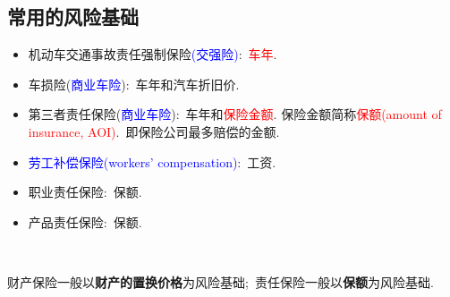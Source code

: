 \documentclass[professionalfont]{beamer}
\newcommand{\red}[1]{\textcolor{red}{#1}}
\newcommand{\green}[1]{\textbf{#1}}
\newcommand{\blue}[1]{\textcolor{blue}{#1}}
\begin{document}
\subsection{常用的风险基础}
	\begin{frame}
		\begin{itemize}
		\item 机动车交通事故责任强制保险\blue{(交强险)}:~\red{车年}.
		\item {车损险}(\blue{商业车险}):~车年和汽车折旧价.
		\item {第三者责任保险}(\blue{商业车险}):~车年和\red{保险金额}. 保险金额简称\red{保额(amount of insurance, AOI)}.~即保险公司最多赔偿的金额.
		\item \blue{劳工补偿保险(workers' compensation)}:~工资.
	\item 职业责任保险:~保额.
	\item 产品责任保险:~保额.
		\end{itemize}
		
		~
		
		财产保险一般以\green{财产的置换价格}为风险基础;~责任保险一般以\green{保额}为风险基础.
	\end{frame}
\end{document}
